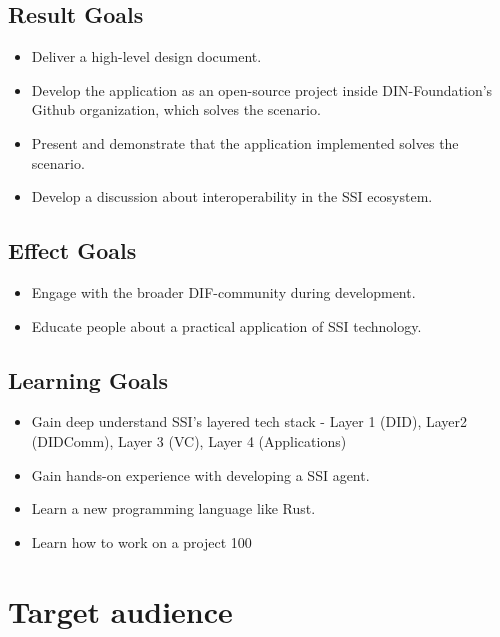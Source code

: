 \subsection{Result Goals}

\begin{itemize}
\item Deliver a high-level design document.
\item Develop the application as an open-source project inside DIN-Foundation's Github organization, which solves the scenario.
\item Present and demonstrate that the application implemented solves the scenario.
\item Develop a discussion about interoperability in the SSI ecosystem.
\end{itemize}

\subsection{Effect Goals}

\begin{itemize}
\item Engage with the broader DIF-community during development.
\item Educate people about a practical application of SSI technology.
\end{itemize}

\subsection{Learning Goals}

\begin{itemize}
\item Gain deep understand SSI's layered tech stack - Layer 1 (DID), Layer2 (DIDComm), Layer 3 (VC), Layer 4 (Applications)
\item Gain hands-on experience with developing a SSI agent.
\item Learn a new programming language like Rust.
\item Learn how to work on a project 100%
\end{itemize}





\section{Target audience}

